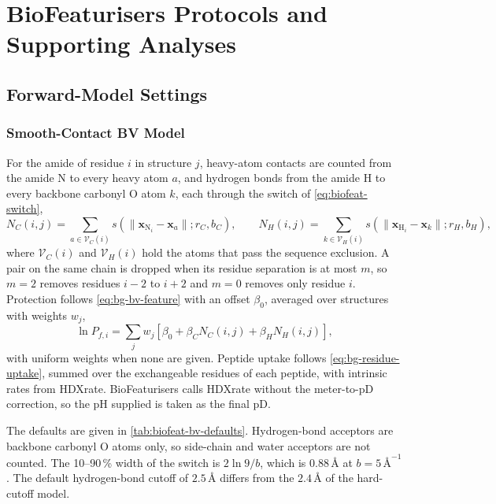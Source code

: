 \chapter{BioFeaturisers Protocols and Supporting Analyses}
\label{app:biofeat-protocols}

\section{Forward-Model Settings}
\label{app:biofeat-forward}

\subsection{Smooth-Contact BV Model}
\label{app:biofeat-bv}

For the amide of residue $i$ in structure $j$, heavy-atom contacts are counted from the amide N to every heavy atom $a$, and hydrogen bonds from the amide H to every backbone carbonyl O atom $k$, each through the switch of \cref{eq:biofeat-switch},
\begin{equation}
    N_C(i,j)=\sum_{a\in\mathcal{V}_C(i)} s\!\left(\lVert\mathbf{x}_{\mathrm{N}_i}-\mathbf{x}_a\rVert;r_C,b_C\right),
    \qquad
    N_H(i,j)=\sum_{k\in\mathcal{V}_H(i)} s\!\left(\lVert\mathbf{x}_{\mathrm{H}_i}-\mathbf{x}_k\rVert;r_H,b_H\right),
    \label{eq:biofeat-counts}
\end{equation}
where $\mathcal{V}_C(i)$ and $\mathcal{V}_H(i)$ hold the atoms that pass the sequence exclusion. A pair on the same chain is dropped when its residue separation is at most $m$, so $m=2$ removes residues $i-2$ to $i+2$ and $m=0$ removes only residue $i$. Protection follows \cref{eq:bg-bv-feature} with an offset $\beta_0$, averaged over structures with weights $w_j$,
\begin{equation}
    \ln P_{f,i}=\sum_j w_j\left[\beta_0+\beta_C N_C(i,j)+\beta_H N_H(i,j)\right],
    \label{eq:biofeat-lnpf}
\end{equation}
with uniform weights when none are given. Peptide uptake follows \cref{eq:bg-residue-uptake}, summed over the exchangeable residues of each peptide, with intrinsic rates from HDXrate. %
BioFeaturisers calls HDXrate without the meter-to-pD correction, so the pH supplied is taken as the final pD.

The defaults are given in \cref{tab:biofeat-bv-defaults}. Hydrogen-bond acceptors are backbone carbonyl O atoms only, so side-chain and water acceptors are not counted. The 10--90\,\% width of the switch is $2\ln9/b$, which is $0.88\,\text{\AA}$ at $b=5\,\text{\AA}^{-1}$. The default hydrogen-bond cutoff of $2.5\,\text{\AA}$ differs from the $2.4\,\text{\AA}$ of the hard-cutoff model.

